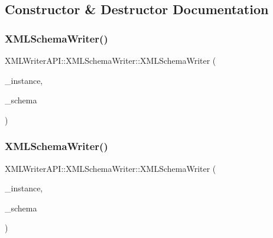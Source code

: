 \subsection{Constructor \& Destructor Documentation}
\mbox{\label{classXMLWriterAPI_1_1XMLSchemaWriter_a2284f6d1214940974d547c380e1ecfc8}} 
\subsubsection{\texorpdfstring{XMLSchemaWriter()}{XMLSchemaWriter()}\hspace{0.1cm}{\footnotesize\ttfamily [1/2]}}
{\footnotesize\ttfamily X\+M\+L\+Writer\+A\+P\+I\+::\+X\+M\+L\+Schema\+Writer\+::\+X\+M\+L\+Schema\+Writer (\begin{DoxyParamCaption}\item[{\mbox{\hyperlink{classXMLWriterAPI_1_1XMLSimpleWriter}{X\+M\+L\+Simple\+Writer}} \&}]{\+\_\+instance,  }\item[{\mbox{\hyperlink{classXMLWriterAPI_1_1XMLSimpleWriter}{X\+M\+L\+Simple\+Writer}} \&}]{\+\_\+schema }\end{DoxyParamCaption})\hspace{0.3cm}{\ttfamily [inline]}}

\mbox{\label{classXMLWriterAPI_1_1XMLSchemaWriter_a2284f6d1214940974d547c380e1ecfc8}} 
\subsubsection{\texorpdfstring{XMLSchemaWriter()}{XMLSchemaWriter()}\hspace{0.1cm}{\footnotesize\ttfamily [2/2]}}
{\footnotesize\ttfamily X\+M\+L\+Writer\+A\+P\+I\+::\+X\+M\+L\+Schema\+Writer\+::\+X\+M\+L\+Schema\+Writer (\begin{DoxyParamCaption}\item[{\mbox{\hyperlink{classXMLWriterAPI_1_1XMLSimpleWriter}{X\+M\+L\+Simple\+Writer}} \&}]{\+\_\+instance,  }\item[{\mbox{\hyperlink{classXMLWriterAPI_1_1XMLSimpleWriter}{X\+M\+L\+Simple\+Writer}} \&}]{\+\_\+schema }\end{DoxyParamCaption})\hspace{0.3cm}{\ttfamily [inline]}}




